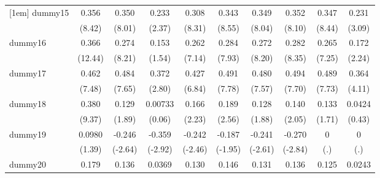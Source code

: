 {\begin{tabular}{l*{9}{c}}
[1em]
dummy15     &       0.356\sym{***}&       0.350\sym{***}&       0.233\sym{*}  &       0.308\sym{***}&       0.343\sym{***}&       0.349\sym{***}&       0.352\sym{***}&       0.347\sym{***}&       0.231\sym{**} \\
            &      (8.42)         &      (8.01)         &      (2.37)         &      (8.31)         &      (8.55)         &      (8.04)         &      (8.10)         &      (8.44)         &      (3.09)         \\
[1em]
dummy16     &       0.366\sym{***}&       0.274\sym{***}&       0.153         &       0.262\sym{***}&       0.284\sym{***}&       0.272\sym{***}&       0.282\sym{***}&       0.265\sym{***}&       0.172\sym{*}  \\
            &     (12.44)         &      (8.21)         &      (1.54)         &      (7.14)         &      (7.93)         &      (8.20)         &      (8.35)         &      (7.25)         &      (2.24)         \\
[1em]
dummy17     &       0.462\sym{***}&       0.484\sym{***}&       0.372\sym{**} &       0.427\sym{***}&       0.491\sym{***}&       0.480\sym{***}&       0.494\sym{***}&       0.489\sym{***}&       0.364\sym{***}\\
            &      (7.48)         &      (7.65)         &      (2.80)         &      (6.84)         &      (7.78)         &      (7.57)         &      (7.70)         &      (7.73)         &      (4.11)         \\
[1em]
dummy18     &       0.380\sym{***}&       0.129         &     0.00733         &       0.166\sym{*}  &       0.189\sym{*}  &       0.128         &       0.140\sym{*}  &       0.133         &      0.0424         \\
            &      (9.37)         &      (1.89)         &      (0.06)         &      (2.23)         &      (2.56)         &      (1.88)         &      (2.05)         &      (1.71)         &      (0.43)         \\
[1em]
dummy19     &      0.0980         &      -0.246\sym{**} &      -0.359\sym{**} &      -0.242\sym{*}  &      -0.187         &      -0.241\sym{**} &      -0.270\sym{**} &           0         &           0         \\
            &      (1.39)         &     (-2.64)         &     (-2.92)         &     (-2.46)         &     (-1.95)         &     (-2.61)         &     (-2.84)         &         (.)         &         (.)         \\
[1em]
dummy20     &       0.179\sym{***}&       0.136\sym{***}&      0.0369         &       0.130\sym{***}&       0.146\sym{***}&       0.131\sym{***}&       0.136\sym{***}&       0.125\sym{***}&      0.0243         \\

\end{tabular}}

